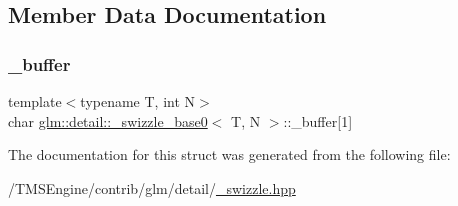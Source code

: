 \subsection{Member Data Documentation}
\mbox{\label{structglm_1_1detail_1_1__swizzle__base0_afd4b7f15c9acff4cdef808f559ffec2d}} 
\subsubsection{\texorpdfstring{\+\_\+buffer}{\_buffer}}
{\footnotesize\ttfamily template$<$typename T, int N$>$ \\
char \hyperlink{structglm_1_1detail_1_1__swizzle__base0}{glm\+::detail\+::\+\_\+swizzle\+\_\+base0}$<$ T, N $>$\+::\+\_\+buffer\mbox{[}1\mbox{]}\hspace{0.3cm}{\ttfamily [protected]}}



The documentation for this struct was generated from the following file\+:\begin{DoxyCompactItemize}
\item 
/\+T\+M\+S\+Engine/contrib/glm/detail/\hyperlink{__swizzle_8hpp}{\+\_\+swizzle.\+hpp}\end{DoxyCompactItemize}
